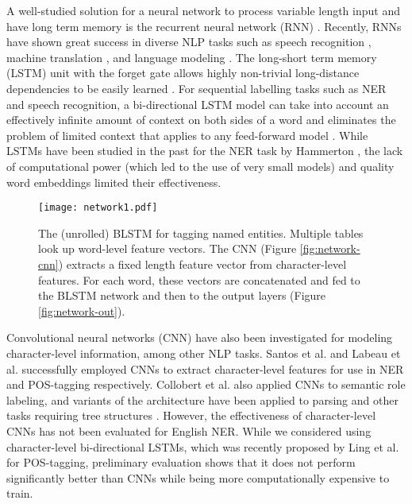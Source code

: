 \documentclass[11pt,letterpaper]{article}
\begin{document}
A well-studied solution for a neural network to process variable length input and have long term memory is the recurrent neural network (RNN) \cite{goller1996}. Recently, RNNs have shown great success in diverse NLP tasks such as speech recognition \cite{graves2013}, machine translation \cite{cho2014}, and language modeling \cite{mikolov2011rnnlm}. The long-short term memory (LSTM) unit with the forget gate allows highly non-trivial long-distance dependencies to be easily learned \cite{gers2000}. For sequential labelling tasks such as NER and speech recognition, a bi-directional LSTM model can take into account an effectively infinite amount of context on both sides of a word and eliminates the problem of limited context that applies to any feed-forward model \cite{graves2013}. While LSTMs have been studied in the past for the NER task by Hammerton , the lack of computational power (which led to the use of very small models) 
and quality word embeddings limited their effectiveness. 

\begin{figure}[t]
\hspace{0.5mm}
\texttt{[image: network1.pdf]} 
\caption{The (unrolled) BLSTM for tagging named entities. Multiple tables look up word-level feature vectors. The CNN (Figure \ref{fig:network-cnn}) extracts a fixed length feature vector from character-level features. For each word, these vectors are concatenated and fed to the BLSTM network and then to the output layers (Figure \ref{fig:network-out}). }
\label{fig:network-main}
\end{figure}

Convolutional neural networks (CNN) have also been investigated for modeling character-level information, among other NLP tasks. Santos et al.  and Labeau et al.  successfully employed CNNs to extract character-level features for use in NER and POS-tagging respectively. Collobert et al.  also applied CNNs to semantic role labeling, and variants of the architecture have been applied to parsing and other tasks requiring tree structures \cite{blunsom2014}. However, the effectiveness of character-level CNNs has not been evaluated for English NER. While we considered using character-level bi-directional LSTMs, which was recently proposed by Ling et al.  for POS-tagging, preliminary evaluation shows that it does not perform significantly better than CNNs while being more computationally expensive to train.
\end{document}
